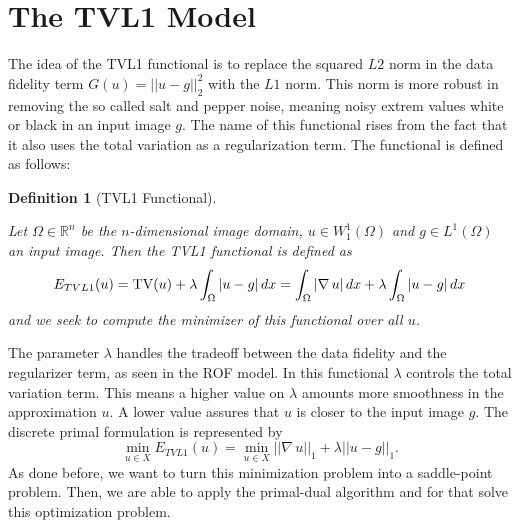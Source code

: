 \documentclass[abstracton]{scrreprt}
\newtheorem{definition}[theorem]{Definition}
\begin{document}


    \section{The TVL1 Model} %
    \label{sec:the_tvl1_model}
        
        The idea of the TVL1 functional is to replace the squared $L2$ norm in the data fidelity term $G(u) = ||u - g||_{2}^{2}$ with the $L1$ norm. This norm is more robust in removing the so called salt and pepper noise, meaning noisy extrem values white or black in an input image $g$. The name of this functional rises from the fact that it also uses the total variation as a regularization term. The functional is defined as follows:
        \begin{definition}[TVL1 Functional] %
        \label{def:tvl1_functional}

            Let $\Omega \in \mathbb{R}^{n}$ be the $n$-dimensional image domain, $u \in W_{1}^{1}(\Omega)$ and $g \in L^{1}(\Omega)$ an input image. Then the TVL1 functional is defined as
                \begin{equation}
                    E_{TVL1}(u) = \textnormal{TV}(u) + \lambda \int_{\Omega} |u - g| \, dx = \int_{\Omega} |\nabla \, u| \, dx + \lambda \int_{\Omega} |u - g| \, dx
                \end{equation}
            and we seek to compute the minimizer of this functional over all $u$.

        \end{definition}
        The parameter $\lambda$ handles the tradeoff between the data fidelity and the regularizer term, as seen in the ROF model. In this functional $\lambda$ controls the total variation term. This means a higher value on $\lambda$ amounts more smoothness in the approximation $u$. A lower value assures that $u$ is closer to the input image $g$. The discrete primal formulation is represented by
            \begin{equation}
                \min_{u \in X} E_{TVL1}(u) = \min_{u \in X} ||\nabla \, u||_{1} + \lambda ||u - g||_{1}.
                \label{eq:primal_formulation_tvl1}
            \end{equation}
        As done before, we want to turn this minimization problem into a saddle-point problem. Then, we are able to apply the primal-dual algorithm and for that solve this optimization problem.
\end{document}
